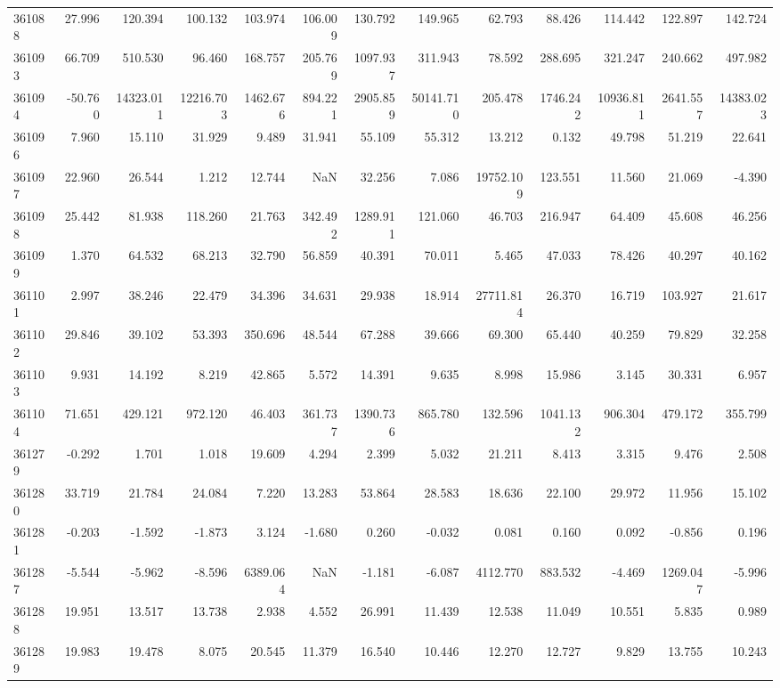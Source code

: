 \begin{tabular}{lrrrrrrrrrrrr}
361088 & 27.996 & 120.394 & 100.132 & 103.974 & 106.009 & 130.792 & 149.965 & 62.793 & 88.426 & 114.442 & 122.897 & 142.724 \\
361093 & 66.709 & 510.530 & 96.460 & 168.757 & 205.769 & 1097.937 & 311.943 & 78.592 & 288.695 & 321.247 & 240.662 & 497.982 \\
361094 & -50.760 & 14323.011 & 12216.703 & 1462.676 & 894.221 & 2905.859 & 50141.710 & 205.478 & 1746.242 & 10936.811 & 2641.557 & 14383.023 \\
361096 & 7.960 & 15.110 & 31.929 & 9.489 & 31.941 & 55.109 & 55.312 & 13.212 & 0.132 & 49.798 & 51.219 & 22.641 \\
361097 & 22.960 & 26.544 & 1.212 & 12.744 & NaN & 32.256 & 7.086 & 19752.109 & 123.551 & 11.560 & 21.069 & -4.390 \\
361098 & 25.442 & 81.938 & 118.260 & 21.763 & 342.492 & 1289.911 & 121.060 & 46.703 & 216.947 & 64.409 & 45.608 & 46.256 \\
361099 & 1.370 & 64.532 & 68.213 & 32.790 & 56.859 & 40.391 & 70.011 & 5.465 & 47.033 & 78.426 & 40.297 & 40.162 \\
361101 & 2.997 & 38.246 & 22.479 & 34.396 & 34.631 & 29.938 & 18.914 & 27711.814 & 26.370 & 16.719 & 103.927 & 21.617 \\
361102 & 29.846 & 39.102 & 53.393 & 350.696 & 48.544 & 67.288 & 39.666 & 69.300 & 65.440 & 40.259 & 79.829 & 32.258 \\
361103 & 9.931 & 14.192 & 8.219 & 42.865 & 5.572 & 14.391 & 9.635 & 8.998 & 15.986 & 3.145 & 30.331 & 6.957 \\
361104 & 71.651 & 429.121 & 972.120 & 46.403 & 361.737 & 1390.736 & 865.780 & 132.596 & 1041.132 & 906.304 & 479.172 & 355.799 \\
361279 & -0.292 & 1.701 & 1.018 & 19.609 & 4.294 & 2.399 & 5.032 & 21.211 & 8.413 & 3.315 & 9.476 & 2.508 \\
361280 & 33.719 & 21.784 & 24.084 & 7.220 & 13.283 & 53.864 & 28.583 & 18.636 & 22.100 & 29.972 & 11.956 & 15.102 \\
361281 & -0.203 & -1.592 & -1.873 & 3.124 & -1.680 & 0.260 & -0.032 & 0.081 & 0.160 & 0.092 & -0.856 & 0.196 \\
361287 & -5.544 & -5.962 & -8.596 & 6389.064 & NaN & -1.181 & -6.087 & 4112.770 & 883.532 & -4.469 & 1269.047 & -5.996 \\
361288 & 19.951 & 13.517 & 13.738 & 2.938 & 4.552 & 26.991 & 11.439 & 12.538 & 11.049 & 10.551 & 5.835 & 0.989 \\
361289 & 19.983 & 19.478 & 8.075 & 20.545 & 11.379 & 16.540 & 10.446 & 12.270 & 12.727 & 9.829 & 13.755 & 10.243 \\

\end{tabular}
